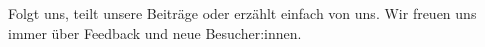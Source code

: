 Folgt uns, teilt unsere Beiträge oder erzählt einfach von uns. Wir
freuen uns immer über Feedback und neue Besucher:innen.
